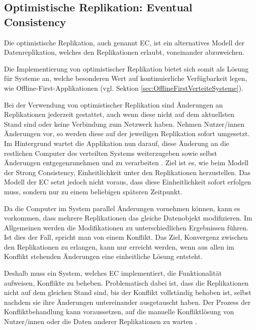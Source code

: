 \documentclass[a4paper, 12pt]{scrreprt}
\begin{document}
\subsection{Optimistische Replikation: Eventual Consistency}

Die optimistische Replikation, auch genannt \acf{EC}, ist ein alternatives Modell der Datenreplikation, welches den Replikationen erlaubt, voneinander abzuweichen.

Die Implementierung von optimistischer Replikation bietet sich somit als Lösung für Systeme an, welche besonderen Wert auf kontinuierliche Verfügbarkeit legen, wie Offline-First-Applikationen (vgl. Sektion \ref{sec:OfflineFirstVerteiteSysteme}). 

Bei der Verwendung von optimistischer Replikation sind Änderungen an Replikationen jederzeit gestattet, auch wenn diese nicht auf dem aktuellsten Stand sind oder keine Verbindung zum Netzwerk haben. Nehmen Nutzer/innen Änderungen vor, so werden diese auf der jeweiligen Replikation sofort umgesetzt. Im Hintergrund wartet die Applikation nun darauf, diese Änderung an die restlichen Computer des verteilten Systems weiterzugeben sowie selbst Änderungen entgegenzunehmen und zu verarbeiten \autocite[S. 46]{ArticleOptimisticReplication}. Ziel ist es, wie beim Modell der Strong Consistency, Einheitlichkeit unter den Replikationen herzustellen. Das Modell der \ac{EC} setzt jedoch nicht voraus, dass diese Einheitlichkeit sofort erfolgen muss, sondern nur zu einem beliebigen späteren Zeitpunkt. 

Da die Computer im System parallel Änderungen vornehmen können, kann es vorkommen, dass mehrere Replikationen das gleiche Datenobjekt modifizieren. Im Allgemeinen werden die Modifikationen zu unterschiedlichen Ergebnissen führen. Ist dies der Fall, spricht man von einem Konflikt. Das Ziel, Konvergenz zwischen den Replikationen zu erlangen, kann nur erreicht werden, wenn aus allen im Konflikt stehenden Änderungen eine einheitliche Lösung entsteht.

Deshalb muss ein System, welches \ac{EC} implementiert, die Funktionalität aufweisen, Konflikte zu beheben. Problematisch dabei ist, dass die Replikationen nicht auf dem gleichen Stand sind, bis der Konflikt vollständig behoben ist, selbst nachdem sie ihre Änderungen untereinander ausgetauscht haben. Der Prozess der Konfliktbehandlung kann voraussetzen, auf die manuelle Konfliktlösung von Nutzer/innen oder die Daten anderer Replikationen zu warten \autocite[S.~174-175]{ArticleEventualConsistencyConflicts}.
\end{document}
